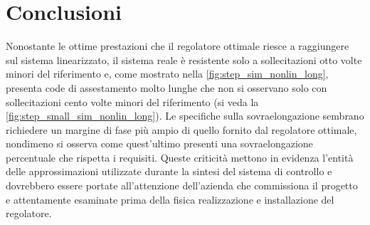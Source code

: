 \documentclass[a4paper]{article}
\begin{document}
\section{Conclusioni}
Nonostante le ottime prestazioni che il regolatore ottimale riesce a raggiungere sul sistema linearizzato, il sistema reale è resistente solo a sollecitazioni otto volte minori del riferimento e, come mostrato nella \cref{fig:step_sim_nonlin_long}, presenta code di assestamento molto lunghe che non si osservano solo con sollecitazioni cento volte minori del riferimento (si veda la \cref{fig:step_small_sim_nonlin_long}). 
Le specifiche sulla sovraelongazione sembrano richiedere un margine di fase più ampio di quello fornito dal regolatore ottimale, nondimeno si osserva come quest'ultimo presenti una sovraelongazione percentuale che rispetta i requisiti.
Queste criticità mettono in evidenza l'entità delle approssimazioni utilizzate durante la sintesi del sistema di controllo e dovrebbero essere portate all'attenzione dell'azienda che commissiona il progetto e attentamente esaminate prima della fisica realizzazione e installazione del regolatore.
\end{document}

